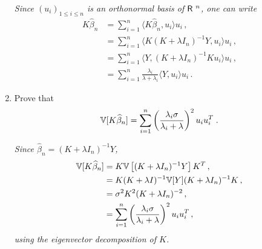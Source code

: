 \begin{enumerate}
\vspace{.2cm}

{\em
Since $(u_i)_{1 \leq i \leq n}$ is an orthonormal basis of ${\sf R}\ ^n$, one can write  
		\begin{align*}
			K \widehat{\beta}_n & = \sum_{i=1}^n \langle K \widehat{\beta}_n, u_i\rangle u_i\,,\\
			& = \sum_{i=1}^n \langle K (K+\lambda I_n)^{-1}Y, u_i\rangle u_i\,,\\
			& = \sum_{i=1}^n \langle Y, (K+\lambda I_n)^{-1} K  u_i\rangle u_i\,,\\
			& = \sum_{i=1}^n \frac{\lambda_i }{\lambda + \lambda_i} \langle Y, u_i \rangle u_i\,.
		\end{align*}
}
\item Prove that
$$
\mathbb{V}[K\widehat \beta_n]=\sum_{i=1}^n \left(\lambda_{i}\sigma\over \lambda_{i}+\lambda\right)^2u_{i}u_{i}^T\;.
$$

\vspace{.2cm}

{\em
Since $\widehat{\beta}_n = (K + \lambda I_n)^{-1}Y$, 
		\begin{align*}
			\mathbb{V} [K \widehat{\beta}_n] & = K \mathbb{V} \left[ (K + \lambda I_n)^{-1} Y \right]K^T\,,\\
			& = K (K + \lambda I)^{-1} \mathbb{V} [Y] (K + \lambda I_n)^{-1} K\,,\\
			& = \sigma^2 K^2 (K + \lambda I_n)^{-2}\,,\\
			& = \sum_{i=1}^n \left( \frac{\lambda_i \sigma }{\lambda_i + \lambda}\right)^2 u_i u_i^T\,,
		\end{align*}
	using the eigenvector decomposition of $K$.
}
\end{enumerate}

